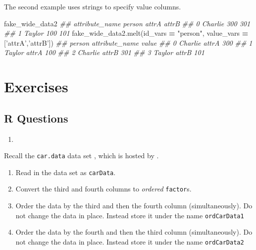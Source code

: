 \documentclass[12pt,krantz2]{krantz}
\makeatletter
\newenvironment{Shaded}{\begin{snugshade}}{\end{snugshade}}
\newcommand{\CommentTok}[1]{\textcolor[rgb]{0.37,0.37,0.37}{\textit{#1}}}
\newcommand{\NormalTok}[1]{#1}
\newcommand{\OperatorTok}[1]{\textcolor[rgb]{0.43,0.43,0.43}{\textbf{#1}}}
\newcommand{\StringTok}[1]{\textcolor[rgb]{0.5,0.5,0.5}{#1}}
\providecommand{\tightlist}{%
  \setlength{\itemsep}{0pt}\setlength{\parskip}{0pt}}
\newenvironment{kframe}{%
\medskip{}
\setlength{\fboxsep}{.8em}
 \def\at@end@of@kframe{}%
 \ifinner\ifhmode%
  \def\at@end@of@kframe{\end{minipage}}%
  \begin{minipage}{\columnwidth}%
 \fi\fi%
 \def\FrameCommand##1{\hskip\@totalleftmargin \hskip-\fboxsep
 \colorbox{shadecolor}{##1}\hskip-\fboxsep
     \hskip-\linewidth \hskip-\@totalleftmargin \hskip\columnwidth}%
 \MakeFramed {\advance\hsize-\width
   \@totalleftmargin\z@ \linewidth\hsize
   \@setminipage}}%
 {\par\unskip\endMakeFramed%
 \at@end@of@kframe}
\renewenvironment{Shaded}{\begin{kframe}}{\end{kframe}}
\makeatother
\begin{document}
The second example uses strings to specify value columns.

\begin{Shaded}
\begin{Highlighting}[]
\NormalTok{fake_wide_data2}
\CommentTok{## attribute_name   person  attrA  attrB}
\CommentTok{## 0               Charlie    300    301}
\CommentTok{## 1                Taylor    100    101}
\NormalTok{fake_wide_data2.melt(id_vars }\OperatorTok{=} \StringTok{"person"}\NormalTok{, }
\NormalTok{                     value_vars }\OperatorTok{=}\NormalTok{ [}\StringTok{'attrA'}\NormalTok{,}\StringTok{'attrB'}\NormalTok{])}
\CommentTok{##     person attribute_name  value}
\CommentTok{## 0  Charlie          attrA    300}
\CommentTok{## 1   Taylor          attrA    100}
\CommentTok{## 2  Charlie          attrB    301}
\CommentTok{## 3   Taylor          attrB    101}
\end{Highlighting}
\end{Shaded}

\hypertarget{exercises-10}{%
\section{Exercises}\label{exercises-10}}

\hypertarget{r-questions-9}{%
\subsection{R Questions}\label{r-questions-9}}

\begin{enumerate}
\def\labelenumi{\arabic{enumi}.}
\item
\end{enumerate}

Recall the \texttt{car.data} data set \citep{misc_car_evaluation_19}, which is hosted by \citep{uci_data}.

\begin{enumerate}
\def\labelenumi{\alph{enumi})}
\tightlist
\item
  Read in the data set as \texttt{carData}.
\item
  Convert the third and fourth columns to \emph{ordered} \texttt{factor}s.
\item
  Order the data by the third and then the fourth column (simultaneously). Do not change the data in place. Instead store it under the name \texttt{ordCarData1}
\item
  Order the data by the fourth and then the third column (simultaneously). Do not change the data in place. Instead store it under the name \texttt{ordCarData2}
\end{enumerate}
\end{document}
